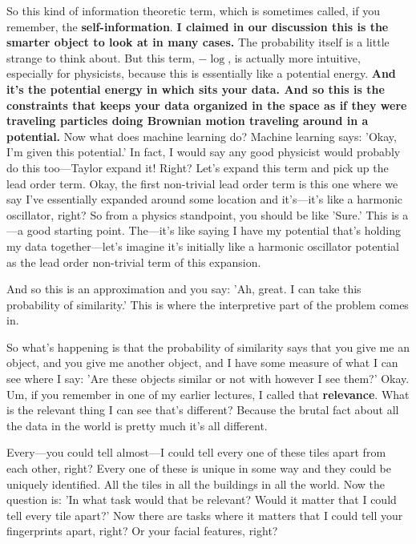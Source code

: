 So this kind of information theoretic term, which is sometimes called, if you remember, the \textbf{self-information}. \textbf{I claimed in our discussion this is the smarter object to look at in many cases.} The probability itself is a little strange to think about. But this term, $-\log$, is actually more intuitive, especially for physicists, because this is essentially like a potential energy. \textbf{And it's the potential energy in which sits your data. And so this is the constraints that keeps your data organized in the space as if they were traveling particles doing Brownian motion traveling around in a potential.}
\medskip \newline
Now what does machine learning do? Machine learning says: 'Okay, I'm given this potential.' In fact, I would say any good physicist would probably do this too—Taylor expand it! Right? Let's expand this term and pick up the lead order term. Okay, the first non-trivial lead order term is this one where we say I've essentially expanded around some location and it's—it's like a harmonic oscillator, right? So from a physics standpoint, you should be like 'Sure.' This is a—a good starting point. The—it's like saying I have my potential that's holding my data together—let's imagine it's initially like a harmonic oscillator potential as the lead order non-trivial term of this expansion. 

And so this is an approximation and you say: 'Ah, great. I can take this probability of similarity.' This is where the interpretive part of the problem comes in. 

So what's happening is that the probability of similarity says that you give me an object, and you give me another object, and I have some measure of what I can see where I say: 'Are these objects similar or not with however I see them?' Okay. Um, if you remember in one of my earlier lectures, I called that \textbf{relevance}. What is the relevant thing I can see that's different? Because the brutal fact about all the data in the world is pretty much it's all different. 

Every—you could tell almost—I could tell every one of these tiles apart from each other, right? Every one of these is unique in some way and they could be uniquely identified. All the tiles in all the buildings in all the world. Now the question is: 'In what task would that be relevant? Would it matter that I could tell every tile apart?' Now there are tasks where it matters that I could tell your fingerprints apart, right? Or your facial features, right? 

